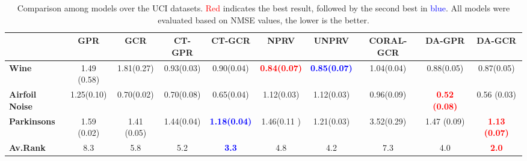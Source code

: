 \documentclass{article}
\begin{document}
    
\begin{table*}[tbh]
\footnotesize
	\begin{center}
    \caption{Comparison among models over the  UCI datasets. \textcolor{red}{Red} indicates the best result, followed by the second best in \textcolor{blue}{blue}. All models were evaluated based on NMSE values, the lower is the better. }
			\label{tb:uci}
				\hfill{}
				\begin{tabular}{lccccccccc} 
					\toprule
					& GPR & GCR & CT-GPR & CT-GCR  & NPRV & UNPRV & CORAL-GCR  & DA-GPR & DA-GCR  \\ 
                    \midrule
					\textbf{Wine} & 1.49 (0.58) & 1.81(0.27) & 0.93(0.03) & 0.90(0.04) & \textcolor{red}{\textbf{0.84(0.07) }} &  \textcolor{blue}{\textbf{0.85(0.07) }} &1.04(0.04) & 0.88(0.05) & 0.87(0.05) \\ 
                    
					\textbf{Airfoil Noise} &1.25(0.10) &0.70(0.02) & 0.70(0.08) & 0.65(0.04) & 1.12(0.03) & 1.12(0.03) & 0.96(0.09) & \textcolor{red}{\textbf{ 0.52 (0.08) }}  & 0.56 (0.03)  \\ 
                    
                    \textbf{Parkinsons} & 1.59  (0.02) & 1.41 (0.05) &  1.44(0.04)  &   \textcolor{blue}{ \textbf{ 1.18(0.04)}} & 1.46(0.11 ) & 1.21(0.03) & 3.52(0.29) & 1.47 (0.09) &  \textcolor{red}{ \textbf{ 1.13 (0.07)}} \\ 
                    \midrule
                       
                    \textbf{Av.Rank} & 8.3 & 5.8 & 5.2 &  \textcolor{blue}{\textbf{3.3}} & 4.8 & 4.2 & 7.3 & 4.0 & \textcolor{red}{\textbf{2.0}}  \\ 
					\bottomrule	
			\end{tabular}
			\hfill{}
	\end{center}
\end{table*}


	

					
\end{document}
